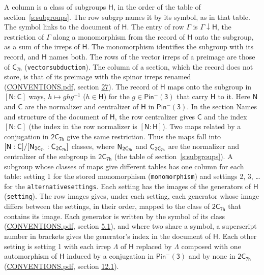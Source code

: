 \documentclass[10pt,a4paper]{article}
\numberwithin{equation}{section}
\newcommand{\grp}[1]{\mathsf{#1}}
\newcommand{\grpindex}[2]{[#1 : #2]}
\newcommand{\restr}[2]{#1\!\downarrow#2}
\newcommand{\hairsp}{\mkern1mu}
\begin{document}
A column is a class of subgroups $\grp{H}$, in the order of the table of section~\ref{s:subgroups}. The row subgrp names it by its symbol, as in that table. The symbol links to the document of $\grp{H}$. The entry of row $\Gamma$ is $\restr{\Gamma}{\grp{H}}$, the restriction of $\Gamma$ along a monomorphism from the record of $\grp{H}$ onto the subgroup, as a sum of the irreps of $\grp{H}$. The monomorphism identifies the subgroup with its record, and $\grp{H}$ names both. The rows of the vector irreps of a preimage are those of \href{../../../rotation/data/pdf/C7h.pdf}{$\grp{C_{7h}}$} (\texttt{vectorsubduction}). The column of a section, which the record does not store, is that of its preimage with the spinor irreps renamed (\href{../../CONVENTIONS.pdf}{CONVENTIONS.pdf}, section \href{../../CONVENTIONS.pdf\#conv.27}{27}). \label{n:group.normalizer.o3}\label{n:group.centralizer.o3}\label{n:element.h}The record of $\grp{H}$ maps onto the subgroup in $\grpindex{\grp{N}}{\grp{C}}$ ways, $h \mapsto g h g^{-1}$ ($h \in \grp{H}$) for the $g \in \grp{Pin^{-}(3)}$ that carry $\grp{H}$ to it. Here $\grp{N}$ and $\grp{C}$ are the normalizer and centralizer of $\grp{H}$ in \href{Pinminus3.pdf}{$\grp{Pin^{-}(3)}$}. In the section Names and structure of the document of $\grp{H}$, the row centralizer gives $\grp{C}$ and the index $\grpindex{\grp{N}}{\grp{C}}$ (the index in the row normalizer is $\grpindex{\grp{N}}{\grp{H}}$). Two maps related by a conjugation in $\grp{2C_{7h}}$ give the same restriction. Thus the maps fall into $\grpindex{\grp{N}}{\grp{C}}/\grpindex{\grp{N}_{\hairsp \grp{2C_{7h}}}}{\grp{C}_{\hairsp \grp{2C_{7h}}}}$ classes, where $\grp{N}_{\hairsp \grp{2C_{7h}}}$ and $\grp{C}_{\hairsp \grp{2C_{7h}}}$ are the normalizer and centralizer of the subgroup in $\grp{2C_{7h}}$ (the table of section~\ref{s:subgroups}). \label{n:head.setting}A subgroup whose classes of maps give different tables has one column for each table: setting 1 for the stored monomorphism (\texttt{monomorphism}) and settings 2, 3, \dots{} for the \texttt{alternativesettings}. Each setting has the images of the generators of $\grp{H}$ (\texttt{setting}). \label{n:head.images}The row images gives, under each setting, each generator whose image differs between the settings, in their order, mapped to the class of $\grp{2C_{7h}}$ that contains its image. Each generator is written by the symbol of its class (\href{../../CONVENTIONS.pdf}{CONVENTIONS.pdf}, section \href{../../../rotation/CONVENTIONS.pdf\#conv.5.1}{5.1}), and where two share a symbol, a superscript number in brackets gives the generator's index in the document of $\grp{H}$. \label{n:irrep.Delta}Each other setting is setting 1 with each irrep $\Lambda$ of $\grp{H}$ replaced by $\Lambda$ composed with one automorphism of $\grp{H}$ induced by a conjugation in \href{Pinminus3.pdf}{$\grp{Pin^{-}(3)}$} and by none in $\grp{2C_{7h}}$ (\href{../../CONVENTIONS.pdf}{CONVENTIONS.pdf}, section \href{../../../rotation/CONVENTIONS.pdf\#conv.12.1}{12.1}).
\end{document}
